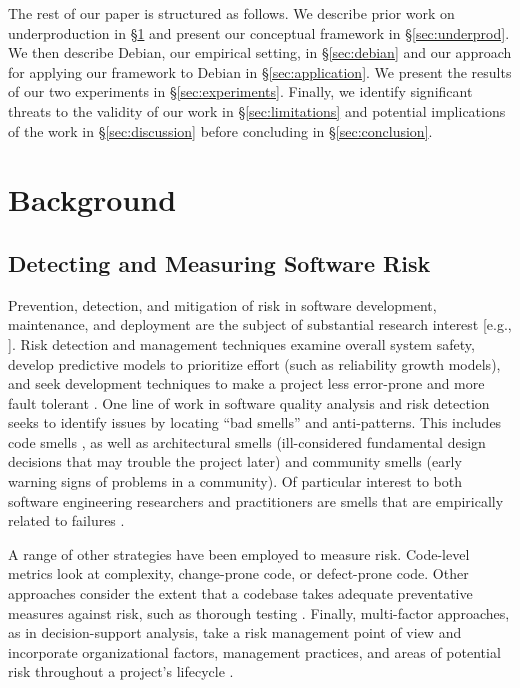 \documentclass[10pt,conference]{IEEEtran}\usepackage[]{graphicx}\usepackage[usenames,dvipsnames]{color}
\begin{document}
The rest of our paper is structured as follows. We describe prior work on underproduction in §\ref{sec:background} and present our conceptual framework in §\ref{sec:underprod}. We then describe Debian, our empirical setting, in §\ref{sec:debian} and our approach for applying our framework to Debian in §\ref{sec:application}. We present the results of our two experiments in §\ref{sec:experiments}. Finally, we identify significant threats to the validity of our work in §\ref{sec:limitations} and potential implications of the work in §\ref{sec:discussion} before concluding in §\ref{sec:conclusion}.

\section{Background}
\label{sec:background}

\subsection{Detecting and Measuring Software Risk} 
\label{sec:align}

Prevention, detection, and mitigation of risk in software development, maintenance, and deployment are the subject of substantial research interest [e.g., ]. Risk detection and management techniques examine overall system safety, develop predictive models to prioritize effort (such as reliability growth models), and seek development techniques to make a project less error-prone and more fault tolerant \cite{bennett_risk_1996}.
One line of work in software quality analysis and risk detection seeks to identify issues by locating ``bad smells'' and anti-patterns. This includes code smells 
\cite{sobrinho_systematic_2018,santos_systematic_2018}, 
as well as architectural smells (ill-considered fundamental design decisions that may trouble the project later) \cite{le_empirical_2018} and community smells (early warning signs of problems in a community). Of particular interest to both software engineering researchers and practitioners are smells that are empirically related to failures \cite{tamburri_exploring_2019}. 

A range of other strategies have been employed to measure risk. Code-level metrics look at complexity, change-prone code, or defect-prone code. Other approaches consider the extent that a codebase takes adequate preventative measures against risk, such as thorough testing \cite{wong_source_2005}. Finally, multi-factor approaches, as in decision-support analysis, take a risk management point of view and incorporate organizational factors, management practices, and areas of potential risk throughout a project's lifecycle \cite{pasha_critical_2018}.
\end{document}
